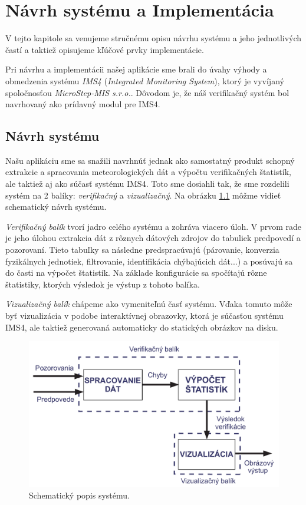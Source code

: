 \chapter{Návrh systému a Implementácia}
V tejto kapitole sa venujeme stručnému opisu návrhu systému a jeho jednotlivých častí a taktiež opisujeme kľúčové prvky implementácie.

Pri návrhu a implementácii našej aplikácie sme brali do úvahy výhody a obmedzenia systému \textit{IMS4} (\textit{Integrated Monitoring System}), ktorý je vyvíjaný spoločnosťou \textit{MicroStep-MIS s.r.o.}. Dôvodom je, že náš verifikačný systém bol navrhovaný ako prídavný modul pre IMS4.

\section{Návrh systému}
\label{sec:sysdesign}
Našu aplikáciu sme sa snažili navrhnúť jednak ako samostatný produkt schopný extrakcie a spracovania meteorologických dát a výpočtu verifikačných štatistík, ale taktiež aj ako súčasť systému IMS4. Toto sme dosiahli tak, že sme rozdelili systém na 2 balíky: \textit{verifikačný} a \textit{vizualizačný}. Na obrázku \ref{fig:system} môžme vidieť schematický návrh systému.

\textit{Verifikačný balík} tvorí jadro celého systému a zohráva viacero úloh. V prvom rade je jeho úlohou extrakcia dát z rôznych dátových zdrojov do tabuliek predpovedí a pozorovaní. Tieto tabuľky sa následne predspracúvajú (párovanie, konverzia fyzikálnych jednotiek, filtrovanie, identifikácia chýbajúcich dát...) a posúvajú sa do časti na výpočet štatistík. Na základe konfigurácie sa spočítajú rôzne štatistiky, ktorých výsledok je výstup z tohoto balíka.

\textit{Vizualizačný balík} chápeme ako vymeniteľnú časť systému. Vďaka tomuto môže byť vizualizácia v podobe interaktívnej obrazovky, ktorá je súčasťou systému IMS4, ale taktiež generovaná automaticky do statických obrázkov na disku.

\begin{figure}
	\centering
	\includegraphics[width = 5in]{system}
	\caption{Schematický popis systému.}
	\label{fig:system} 
\end{figure}

